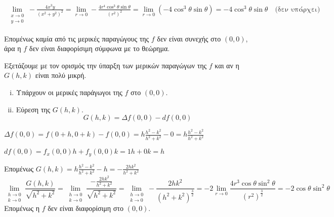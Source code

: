 \begin{example}
\begin{solution}
\begin{description}
\begin{myitemize}
\begin{align*}
                            \lim\limits_{\substack{x\to 0 \\y \to 0}} -
                            \frac{4x^{3}y}{(x^{2}+y^{2})^{2}} = \lim_{r \to 0} -
                            \frac{4r^{4} \cos^{3}{\theta} \sin{\theta}}{(r^{2})^{2}} = 
                            \lim_{r \to 0} (-4 \cos^{3}{\theta} \sin{\theta}) = 
                            -4 \cos^{3}{\theta} \sin{\theta} \quad \text{(δεν υπάρχει)}
                        \end{align*}
                \end{myitemize}

                Επομένως καμία από τις μερικές παραγώγους της $f$ δεν είναι συνεχής στο
                $(0,0)$, άρα η $f$ δεν είναι διαφορίσιμη σύμφωνα με το θεώρημα.
            \item [Β᾽ Τρόπος: (Με ορισμό)]
            \item {}
                Εξετάζουμε με τον ορισμός την ύπαρξη των μερικών παραγώγων της $f$
                και αν η $ G(h,k) $ είναι πολύ μικρή.
                \begin{enumerate}[i)]
                    \item Υπάρχουν οι μερικές παράγωγοι της $f$ στο $ (0,0) $.
                    \item Εύρεση της $ G(h,k) $.
                        \[
                            G(h,k) = \Delta f(0,0) - df(0,0) 
                        \] 
                \end{enumerate}
                \begin{myitemize}
                    \item $ \Delta f(0,0) = f(0+h,0+k) - f(0,0) = 
                        h \frac{h^{2}-k^{2}}{h^{2}+k^{2}} - 0 = h
                        \frac{h^{2}-k^{2}}{h^{2}+k^{2}} $
                    \item $ df(0,0) = f_{x}(0,0)h+f_{y}(0,0)k = 1h+0k= h $
                \end{myitemize}
                Επομένως $ G(h,k) = h \frac{h^{2}-k^{2}}{h^{2}+k^{2}} - h =
                - \frac{2hk^{2}}{h^{2}+k^{2}}$
                \[
                    \lim\limits_{\substack{h\to 0 \\k \to 0}} 
                    \frac{G(h,k)}{\sqrt{h^{2}+k^{2}}} =
                    \lim\limits_{\substack{h\to 0 \\k \to 0}} 
                    \frac{-\frac{2hk^{2}}{h^{2}+k^{2}}}{\sqrt{h^{2}+k^{2}}}
                    = \lim\limits_{\substack{h\to 0 \\k \to 0}}-
                    \frac{2hk^{2}}{(h^{2}+k^{2})^{\frac{3}{2}}} =
                    -2 \lim_{r \to 0} \frac{4r^{3} \cos{\theta}
                    \sin^{2}{\theta}}{(r^{2})^{\frac{3}{2}}} =
                    -2 \cos{\theta} \sin^{2}{\theta}  
                \]
                Επομένως η $f$ δεν είναι διαφορίσιμη στο $ (0,0) $.  
        \end{description}
    \end{solution}
\end{example}

